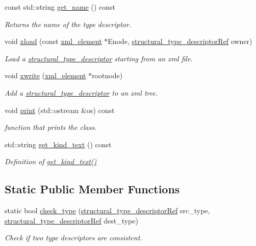 \begin{DoxyCompactItemize}
const std\+::string \hyperlink{structstructural__type__descriptor_a1eb64dc01fff3ab53fc01588361801f5}{get\+\_\+name} () const
\begin{DoxyCompactList}\small\item\em Returns the name of the type descriptor. \end{DoxyCompactList}\item 
void \hyperlink{structstructural__type__descriptor_aa884cd403a3f82933f4969e0250cc5ff}{xload} (const \hyperlink{classxml__element}{xml\+\_\+element} $\ast$Enode, \hyperlink{structural__objects_8hpp_a219296792577e3292783725961506c83}{structural\+\_\+type\+\_\+descriptor\+Ref} owner)
\begin{DoxyCompactList}\small\item\em Load a \hyperlink{structstructural__type__descriptor}{structural\+\_\+type\+\_\+descriptor} starting from an xml file. \end{DoxyCompactList}\item 
void \hyperlink{structstructural__type__descriptor_ad0fc728cbbedbabdd23bb2e9e749b89c}{xwrite} (\hyperlink{classxml__element}{xml\+\_\+element} $\ast$rootnode)
\begin{DoxyCompactList}\small\item\em Add a \hyperlink{structstructural__type__descriptor}{structural\+\_\+type\+\_\+descriptor} to an xml tree. \end{DoxyCompactList}\item 
void \hyperlink{structstructural__type__descriptor_a90759017b6c040dd29d2cdf02e89416c}{print} (std\+::ostream \&os) const
\begin{DoxyCompactList}\small\item\em function that prints the class. \end{DoxyCompactList}\item 
std\+::string \hyperlink{structstructural__type__descriptor_aed5b7adc96acdd6cc4b3030c97c5d9b5}{get\+\_\+kind\+\_\+text} () const
\begin{DoxyCompactList}\small\item\em Definition of \hyperlink{structstructural__type__descriptor_aed5b7adc96acdd6cc4b3030c97c5d9b5}{get\+\_\+kind\+\_\+text()} \end{DoxyCompactList}\end{DoxyCompactItemize}
\subsection*{Static Public Member Functions}
\begin{DoxyCompactItemize}
\item 
static bool \hyperlink{structstructural__type__descriptor_a526678aa02ed449cfc5a2a6268de0963}{check\+\_\+type} (\hyperlink{structural__objects_8hpp_a219296792577e3292783725961506c83}{structural\+\_\+type\+\_\+descriptor\+Ref} src\+\_\+type, \hyperlink{structural__objects_8hpp_a219296792577e3292783725961506c83}{structural\+\_\+type\+\_\+descriptor\+Ref} dest\+\_\+type)
\begin{DoxyCompactList}\small\item\em Check if two type descriptors are consistent. \end{DoxyCompactList}\end{DoxyCompactItemize}
